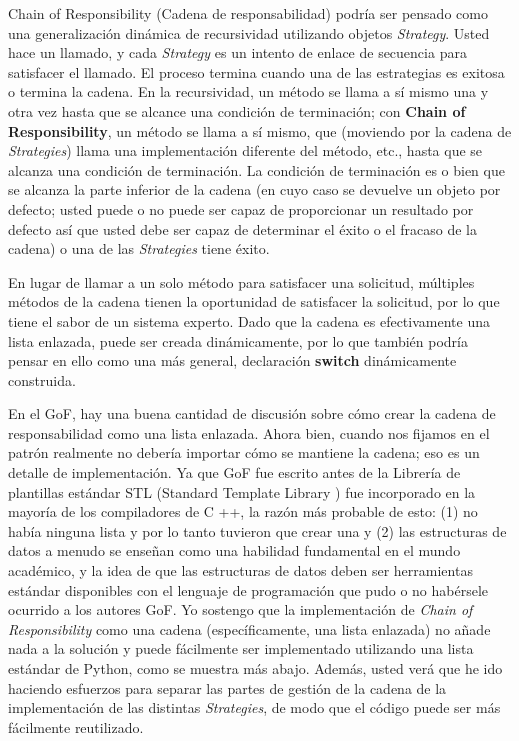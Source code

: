 Chain of Responsibility (Cadena de responsabilidad) podría ser pensado como una generalización dinámica de recursividad utilizando objetos \textit{Strategy}. Usted hace un llamado, y cada \textit{Strategy} es un intento de enlace de secuencia para satisfacer el llamado. El proceso termina cuando una de las estrategias es exitosa o termina la cadena. En la recursividad, un método se llama a sí mismo una y otra vez hasta que se alcance una condición de terminación; con \textbf{Chain of Responsibility}, un método se llama a sí mismo, que (moviendo por la cadena de \textit{Strategies}) llama una implementación diferente del método, etc., hasta que se alcanza una condición de terminación. La condición de terminación es o bien que se alcanza la parte inferior de la cadena (en cuyo caso se devuelve un objeto por defecto; usted puede o no puede ser capaz de proporcionar un resultado por defecto así que usted debe ser capaz de determinar el éxito o el fracaso de la cadena) o una de las \textit{Strategies} tiene éxito.      \newline

En lugar de llamar a un solo método para satisfacer una solicitud, múltiples métodos de la cadena tienen la oportunidad de satisfacer la solicitud, por lo que tiene el sabor de un sistema experto. Dado que la cadena es efectivamente una lista enlazada, puede ser creada dinámicamente, por lo que también podría pensar en ello como una más general, declaración \textbf{switch} dinámicamente construida.   \newline

En el GoF, hay una buena cantidad de discusión sobre cómo crear la cadena de responsabilidad como una lista enlazada. Ahora bien, cuando nos fijamos en el patrón realmente no debería importar cómo se mantiene la cadena; eso es un detalle de implementación. Ya que GoF fue escrito antes de la Librería de plantillas estándar STL (Standard Template Library ) fue incorporado en la mayoría de los compiladores de C ++, la razón más probable de esto: (1) no había ninguna lista y por lo tanto tuvieron que crear una y (2) las estructuras de datos a menudo se enseñan como una habilidad fundamental en el mundo académico, y la idea de que las estructuras de datos deben ser herramientas estándar disponibles con el lenguaje de programación que pudo o no habérsele ocurrido a los autores GoF. Yo sostengo que la implementación de \textit{Chain of Responsibility} como una cadena  (específicamente, una lista enlazada) no añade nada a la solución y puede fácilmente ser implementado utilizando una lista estándar de Python, como se muestra más abajo. Además, usted verá que he ido haciendo esfuerzos para separar las partes de gestión de la cadena de la implementación de las distintas \textit{Strategies}, de modo que el código puede ser más fácilmente reutilizado.    \newline


